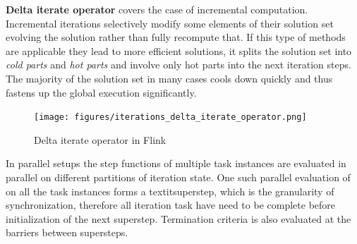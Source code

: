 \textbf{Delta iterate operator} covers the case of incremental computation. Incremental iterations selectively modify some elements of their solution set evolving the solution rather than fully recompute that. If this type of methods are applicable they lead to more efficient solutions, it splits the solution set into \textit{cold parts} and \textit{hot parts} and involve only hot parts into the next iteration steps. The majority of the solution set in many cases cools down quickly and thus fastens up the global execution significantly.
\begin{figure}[!ht]
  \centering    
      \texttt{[image: figures/iterations\_delta\_iterate\_operator.png]}
  \caption{Delta iterate operator in Flink\cite{flink_doc_iteration}}
  \label{fig:iterations_iterate_operator}
\end{figure}
In parallel setups the step functions of multiple task instances are evaluated in parallel on different partitions of iteration state. One such parallel evaluation of on all the task instances forms a textit{superstep}, which is the granularity of synchronization, therefore all iteration task have need to be complete before initialization of the next superstep. Termination criteria is also evaluated at the barriers between supersteps.	
\cite{flink_doc_iteration}

